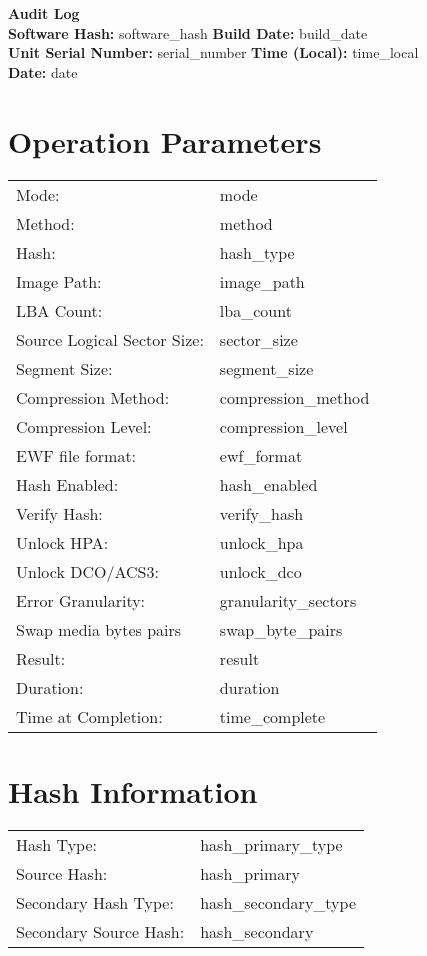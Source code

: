 \documentclass[a4paper,10pt]{article}
\begin{document}
\small

{\LARGE\textbf{Audit Log}}\\[1em]

\textbf{Software Hash:} {{ software_hash }} \hfill \textbf{Build Date:} {{ build_date }}\\
\textbf{Unit Serial Number:} {{ serial_number }} \hfill \textbf{Time (Local):} {{ time_local }}\\
\textbf{Date:} {{ date }}

\vspace{1em}
\section*{Operation Parameters}
\begin{tabular}{@{}ll}
Mode: & {{ mode }} \\
Method: & {{ method }} \\
Hash: & {{ hash_type }} \\
Image Path: & {{ image_path }} \\
LBA Count: & {{ lba_count }} \\
Source Logical Sector Size: & {{ sector_size }} \\
Segment Size: & {{ segment_size }} \\
Compression Method: & {{ compression_method }} \\
Compression Level: & {{ compression_level }} \\
EWF file format: & {{ ewf_format }} \\
Hash Enabled: & {{ hash_enabled }} \\
Verify Hash: & {{ verify_hash }} \\
Unlock HPA: & {{ unlock_hpa }} \\
Unlock DCO/ACS3: & {{ unlock_dco }} \\
Error Granularity: & {{ granularity_sectors }} \\
Swap media bytes pairs & {{ swap_byte_pairs }} \\
Result: & {{ result }} \\
Duration: & {{ duration }} \\
Time at Completion: & {{ time_complete }} \\
\end{tabular}

\vspace{1em}
\section*{Hash Information}
\begin{tabular}{@{}ll}
Hash Type: & {{ hash_primary_type }} \\
Source Hash: & {{ hash_primary }} \\
Secondary Hash Type: & {{ hash_secondary_type }} \\
Secondary Source Hash: & {{ hash_secondary }} \\
\end{tabular}
\end{document}
